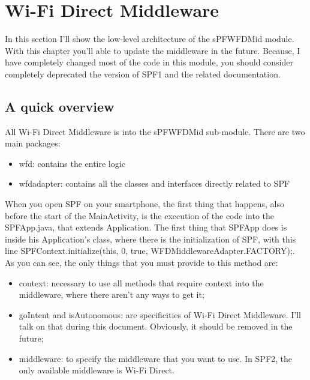 \chapter{Wi-Fi Direct Middleware}
\label{chap2}
\thispagestyle{empty}

\noindent In this section I'll show the low-level architecture of the sPFWFDMid module. With this chapter you'll able to update the middleware in the future. Because, I have completely changed most of the code in this module, you should consider completely deprecated the version of SPF1 and the related documentation.

\section{A quick overview}

All Wi-Fi Direct Middleware is into the sPFWFDMid sub-module. There are two main packages:

\begin{itemize}
	\item wfd: contains the entire logic 
	\item wfdadapter: contains all the classes and interfaces directly related to SPF
\end{itemize}

When you open SPF on your smartphone, the first thing that happens, also before the start of the MainActivity, is the execution of the code into the SPFApp.java, that extends Application. 
The first thing that SPFApp does is inside his Application's class, where there is the initialization of SPF, with this line \textsf{SPFContext.initialize(this, 0, true, WFDMiddlewareAdapter.FACTORY);}. As you can see, the only things that you must provide to this method are:
\begin{itemize}
	\item context: necessary to use all methods that require context into the middleware, where there aren't any ways to get it;
	\item goIntent and isAutonomous: are specificities of Wi-Fi Direct Middleware. I'll talk on that during this document. Obviously, it should be removed in the future;
	\item middleware: to specify the middleware that you want to use. In SPF2, the only available middleware is Wi-Fi Direct.
\end{itemize}



